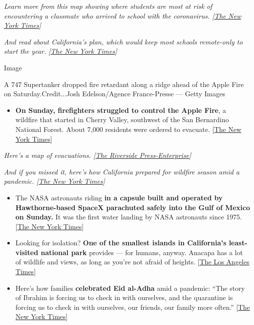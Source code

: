 \emph{Learn more from this map showing where students are most at risk
of encountering a classmate who arrived to school with the coronavirus.
{[}}\href{https://www.nytimes3xbfgragh.onion/interactive/2020/07/31/us/coronavirus-school-reopening-risk.html?}{\emph{The
New York Times}}\emph{{]}}

\emph{And read about California's plan, which would keep most schools
remote-only to start the year.
{[}}\href{https://www.nytimes3xbfgragh.onion/2020/07/17/us/california-schools-reopening-newsom.html}{\emph{The
New York Times}}\emph{{]}}

Image

A 747 Supertanker dropped fire retardant along a ridge ahead of the
Apple Fire on Saturday.Credit...Josh Edelson/Agence France-Presse ---
Getty Images

\begin{itemize}
\tightlist
\item
  \textbf{On Sunday, firefighters struggled to control the Apple Fire},
  a wildfire that started in Cherry Valley, southwest of the San
  Bernardino National Forest. About 7,000 residents were ordered to
  evacuate.
  {[}\href{https://www.nytimes3xbfgragh.onion/2020/08/02/us/apple-fire-ca.html?}{The
  New York Times}{]}
\end{itemize}

\emph{Here's a map of evacuations.
{[}}\href{https://www.pe.com/2020/08/01/this-map-shows-the-location-evacuations-for-the-apple-fire-in-cherry-valley/}{\emph{The
Riverside Press-Enterprise}}\emph{{]}}

\emph{And if you missed it, here's how California prepared for wildfire
season amid a pandemic.
{[}}\href{https://www.nytimes3xbfgragh.onion/2020/07/10/us/california-wildfires-coronavirus.html}{\emph{The
New York Times}}\emph{{]}}

\begin{itemize}
\item
  The NASA astronauts riding \textbf{in a capsule built and operated by
  Hawthorne-based SpaceX parachuted safely into the Gulf of Mexico on
  Sunday.} It was the first water landing by NASA astronauts since 1975.
  {[}\href{https://www.nytimes3xbfgragh.onion/2020/08/02/science/spacex-astronauts-splashdown.html}{The
  New York Times}{]}
\item
  Looking for isolation? \textbf{One of the smallest islands in
  California's least-visited national park} provides --- for humans,
  anyway. Anacapa has a lot of wildlife and views, as long as you're not
  afraid of heights.
  {[}\href{https://www.latimes.com/travel/story/2020-07-31/channel-island-birds-gulls-anacapa}{The
  Los Angeles Times}{]}
\item
  Here's how families \textbf{celebrated Eid al-Adha} amid a pandemic:
  ``The story of Ibrahim is forcing us to check in with ourselves, and
  the quarantine is forcing us to check in with ourselves, our friends,
  our family more often.''
  {[}\href{https://www.nytimes3xbfgragh.onion/2020/08/01/us/eid-al-adha-coronavirus.html}{The
  New York Times}{]}
\end{itemize}

